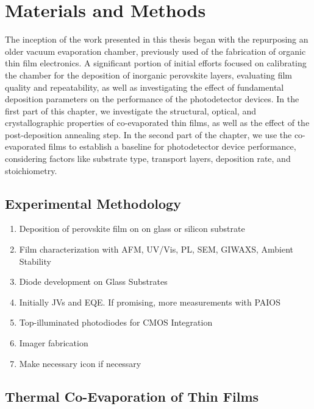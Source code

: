 \chapter{Materials and Methods}\label{ch:material_properties}

The inception of the work presented in this thesis began with the repurposing an older vacuum evaporation chamber, previously used of the fabrication of organic thin film electronics. A significant portion of initial efforts focused on calibrating the chamber for the deposition of inorganic perovskite layers, evaluating film quality and repeatability, as well as investigating the effect of fundamental deposition parameters on the performance of the photodetector devices. In the first part of this chapter, we investigate the structural, optical, and crystallographic properties of co-evaporated  thin films, as well as the effect of the post-deposition annealing step. In the second part of the chapter, we use the co-evaporated films to establish a baseline for photodetector device performance, considering factors like substrate type, transport layers, deposition rate, and stoichiometry. 


\section{Experimental Methodology}

\begin{enumerate}
    \item Deposition of perovskite film on on glass or silicon substrate 
    \item  Film characterization with AFM, UV/Vis, PL, SEM, GIWAXS, Ambient Stability
    \item Diode development on Glass Substrates 
    \item Initially JVs and EQE. If promising, more measurements with PAIOS 
    \item Top-illuminated photodiodes for CMOS Integration 
    \item Imager fabrication 
    \item Make necessary icon if necessary 
    
\end{enumerate}


\section{Thermal Co-Evaporation of  Thin Films}

